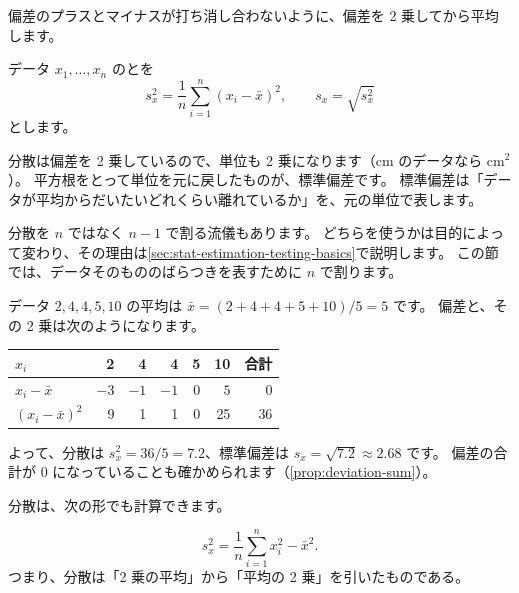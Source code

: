 偏差のプラスとマイナスが打ち消し合わないように、偏差を 2 乗してから平均します。

\begin{definition}
  データ $x_1, \dots, x_n$ のとを
  \[
    s_x^2 = \frac{1}{n} \sum_{i=1}^{n} (x_i - \bar{x})^2, \qquad
    s_x = \sqrt{s_x^2}
  \]
  とします。
\end{definition}

分散は偏差を 2 乗しているので、単位も 2 乗になります（cm のデータなら cm$^2$）。
平方根をとって単位を元に戻したものが、標準偏差です。
標準偏差は「データが平均からだいたいどれくらい離れているか」を、元の単位で表します。

\begin{supplement}
  分散を $n$ ではなく $n-1$ で割る流儀もあります。
  どちらを使うかは目的によって変わり、その理由は\cref{sec:stat-estimation-testing-basics}で説明します。
  この節では、データそのもののばらつきを表すために $n$ で割ります。
\end{supplement}

\begin{example}
  データ $2, 4, 4, 5, 10$ の平均は $\bar{x} = (2+4+4+5+10)/5 = 5$ です。
  偏差と、その 2 乗は次のようになります。
  \begin{center}
    \begin{tabular}{lrrrrr|r}
      \toprule
      $x_i$ & 2 & 4 & 4 & 5 & 10 & 合計 \\
      \midrule
      $x_i - \bar{x}$ & $-3$ & $-1$ & $-1$ & $0$ & $5$ & $0$ \\
      $(x_i - \bar{x})^2$ & 9 & 1 & 1 & 0 & 25 & 36 \\
      \bottomrule
    \end{tabular}
  \end{center}
  よって、分散は $s_x^2 = 36/5 = 7.2$、標準偏差は $s_x = \sqrt{7.2} \approx 2.68$ です。
  偏差の合計が $0$ になっていることも確かめられます（\cref{prop:deviation-sum}）。
\end{example}

分散は、次の形でも計算できます。

\begin{theorem}
  \[
    s_x^2 = \frac{1}{n} \sum_{i=1}^{n} x_i^2 - \bar{x}^2.
  \]
  つまり、分散は「2 乗の平均」から「平均の 2 乗」を引いたものである。
\end{theorem}

